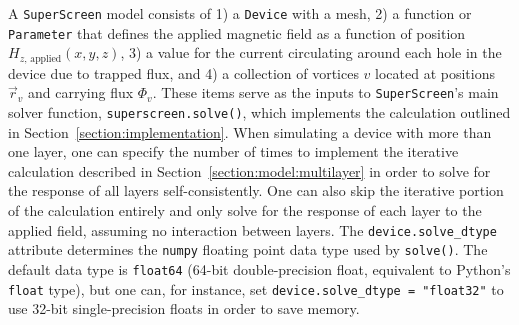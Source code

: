 \documentclass[final,3p,times,twocolumn]{elsarticle}
\newcommand{\inline}[1]{\texttt{#1}\xspace}
\newcommand{\SuperScreen}{\inline{SuperScreen}}
\begin{document}
A \SuperScreen model consists of 1) a \inline{Device} with a mesh, 2) a function or \inline{Parameter} that defines the applied magnetic field as a function of position $H_{z,\,\mathrm{applied}}(x, y, z)$, 3) a value for the current circulating around each hole in the device due to trapped flux, and 4) a collection of vortices $v$ located at positions $\vec{r}_v$ and carrying flux $\Phi_v$. These items serve as the inputs to \SuperScreen's main solver function, \inline{superscreen.solve()}, which implements the calculation outlined in Section~\ref{section:implementation}. When simulating a device with more than one layer, one can specify the number of times to implement the iterative calculation described in Section~\ref{section:model:multilayer} in order to solve for the response of all layers self-consistently. One can also skip the iterative portion of the calculation entirely and only solve for the response of each layer to the applied field, assuming no interaction between layers. The \inline{device.solve_dtype} attribute determines the \inline{numpy} floating point data type used by \inline{solve()}. The default data type is \inline{float64} (64-bit double-precision float, equivalent to Python's \inline{float} type), but one can, for instance, set \inline{device.solve_dtype = "float32"} to use 32-bit single-precision floats in order to save memory.
\end{document}
